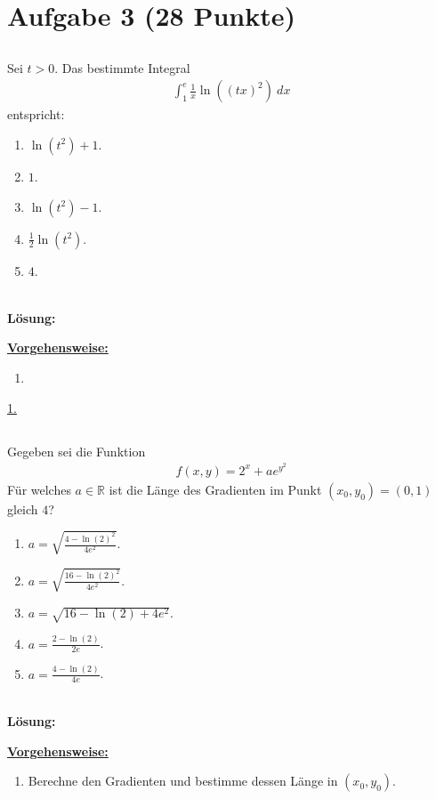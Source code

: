 \section*{Aufgabe 3 (28 Punkte)}
\vspace{0.4cm}
\subsection*{}
Sei $t > 0$. Das bestimmte Integral
\begin{align*}
	\int_1^e \frac{1}{x} \ln\left((tx)^2\right) \ dx
\end{align*}
entspricht:
\renewcommand{\labelenumi}{(\alph{enumi})}
\begin{enumerate}
	\item 
	$ \ln(t^2)  +1  $.
	\item
	$ 1 $.
	\item
	$ \ln(t^2) -1 $.
	\item 
	$\frac{1}{2} \ln(t^2)$.
	\item $4$.
\end{enumerate}
\ \\
\textbf{Lösung:}
\begin{mdframed}
\underline{\textbf{Vorgehensweise:}}
\renewcommand{\labelenumi}{\theenumi.}
\begin{enumerate}
\item 
\end{enumerate}
\end{mdframed}

\underline{1. }\\


 
\newpage

\subsection*{}
Gegeben sei die Funktion
\begin{align*}
	f(x,y) = 2^x +  a e^{y^2}
\end{align*}
Für welches $a \in \mathbb{R}$ ist die Länge des Gradienten im Punkt $(x_0,y_0) = (0,1)$ gleich $4$?
\renewcommand{\labelenumi}{(\alph{enumi})}
\begin{enumerate}
	\item 
	$a = \sqrt{\frac{4 - \ln(2)^2}{4 e^2}} $.
	\item
	$a = \sqrt{\frac{16 - \ln(2)^2}{4 e^2}}$.
	\item
	$a = \sqrt{16 - \ln(2) + 4 e^2}$.
	\item
	$a = \frac{2 - \ln(2)}{2 e }$.
	\item 
	$a = \frac{4 - \ln(2)}{4e}$.
\end{enumerate}
\ \\
\textbf{Lösung:}
\begin{mdframed}
\underline{\textbf{Vorgehensweise:}}
\renewcommand{\labelenumi}{\theenumi.}
\begin{enumerate}
\item Berechne den Gradienten und bestimme dessen Länge in $(x_0,y_0)$.
\end{enumerate}
\end{mdframed}

